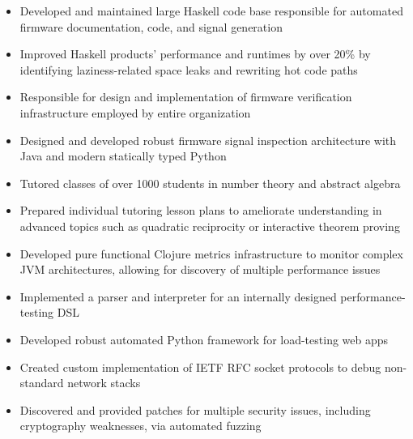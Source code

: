 \documentclass[10pt,a4paper]{altacv}
\newenvironment{tightitemize} %
{\begin{itemize}\itemsep1pt \parskip0pt \parsep0pt}
{\end{itemize}\vspace{-\topsep}}
\begin{document}
\begin{tightitemize}
\item Developed and maintained large Haskell code base responsible for automated firmware 
    documentation, code, and signal generation
\item Improved Haskell products' performance and runtimes by over 20\% by 
  identifying laziness-related space leaks and rewriting hot code paths
\item Responsible for design and implementation of firmware
    verification infrastructure employed by entire organization
\item Designed and developed robust firmware signal inspection architecture with 
    Java and modern statically typed Python
\end{tightitemize}

\smallskip
\divider

\begin{tightitemize}
\item Tutored classes of over 1000 students in number theory and abstract algebra
\item Prepared individual tutoring lesson plans to ameliorate 
    understanding in advanced topics such as quadratic reciprocity or 
    interactive theorem proving
\end{tightitemize}

\smallskip
\divider

\begin{tightitemize}
    \item Developed pure functional Clojure metrics infrastructure to monitor 
        complex JVM architectures, allowing for discovery of multiple 
        performance issues
    \item Implemented a parser and interpreter for an internally designed 
      performance-testing DSL
\end{tightitemize}

\smallskip
\divider

\begin{tightitemize}
    \item Developed robust automated Python framework for load-testing web apps
    \item Created custom implementation of IETF RFC socket protocols to debug 
        non-standard network stacks
    \item Discovered and provided patches for multiple security issues, 
        including cryptography weaknesses, via automated fuzzing
\end{tightitemize}
\end{document}
